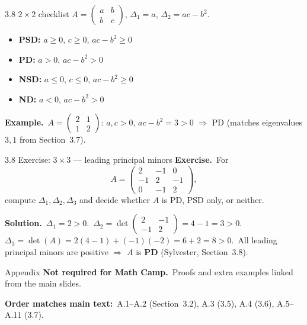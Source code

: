 \documentclass[11pt,aspectratio=169]{beamer}
\newcommand{\THFrame}[1]{\begin{frame}{#1 \quad {\small\textcolor{mAccent}{Take home}}}}
\begin{document}
\begin{frame}{3.8 $2\times 2$ checklist}
  \footnotesize
  $A=\begin{pmatrix}a&b\\ b&c\end{pmatrix}$, $\Delta_1=a$, $\Delta_2=ac-b^2$.

  \medskip
  \begin{itemize}
    \item \textbf{PSD:} $a\ge 0$, $c\ge 0$, $ac-b^2\ge 0$
    \item \textbf{PD:} $a>0$, $ac-b^2>0$
    \item \textbf{NSD:} $a\le 0$, $c\le 0$, $ac-b^2\ge 0$
    \item \textbf{ND:} $a<0$, $ac-b^2>0$
  \end{itemize}

  \medskip
  \textbf{Example.}\
  $A=\begin{pmatrix}2&1\\ 1&2\end{pmatrix}$: $a,c>0$, $ac-b^2=3>0$ $\Rightarrow$ PD (matches eigenvalues $3,1$ from Section~3.7).
\end{frame}

\THFrame{3.8 Exercise: $3\times 3$ --- leading principal minors}
  \footnotesize
  \textbf{Exercise.}\
  For
  \[
    A=
    \begin{pmatrix}
      2&-1&0\\
      -1&2&-1\\
      0&-1&2
    \end{pmatrix},
  \]
  compute $\Delta_1,\Delta_2,\Delta_3$ and decide whether $A$ is PD, PSD only, or neither.

  \textbf{Solution.}\
  $\Delta_1=2>0$.\
  $\Delta_2=\det\begin{pmatrix}2&-1\\-1&2\end{pmatrix}=4-1=3>0$.\
  $\Delta_3=\det(A)=2(4-1)+(-1)(-2)=6+2=8>0$.\
  All leading principal minors are positive $\Rightarrow$ $A$ is \textbf{PD} (Sylvester, Section~3.8).
\end{frame}

\appendix

\begin{frame}{Appendix}
  \small
  \textbf{Not required for Math Camp.}\
  Proofs and extra examples linked from the main slides.

  \medskip
  \footnotesize
  \textbf{Order matches main text:}\
  A.1--A.2 (Section~3.2), A.3 (3.5), A.4 (3.6), A.5--A.11 (3.7).
\end{frame}
\end{document}

